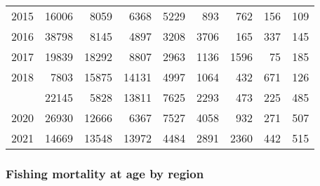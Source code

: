 \documentclass[
]{article}
\begin{document}
\begin{longtable}[t]{lrrrrrrrr}
2015 & 16006 & 8059 & 6368 & 5229 & 893 & 762 & 156 & 109\\
2016 & 38798 & 8145 & 4897 & 3208 & 3706 & 165 & 337 & 145\\
2017 & 19839 & 18292 & 8807 & 2963 & 1136 & 1596 & 75 & 185\\
2018 & 7803 & 15875 & 14131 & 4997 & 1064 & 432 & 671 & 126\\
\addlinespace
2019 & 22145 & 5828 & 13811 & 7625 & 2293 & 473 & 225 & 485\\
2020 & 26930 & 12666 & 6367 & 7527 & 4058 & 932 & 271 & 507\\
2021 & 14669 & 13548 & 13972 & 4484 & 2891 & 2360 & 442 & 515\\*
\end{longtable}

\hypertarget{fishing-mortality-at-age-by-region}{%
\subsubsection{Fishing mortality at age by
region}\label{fishing-mortality-at-age-by-region}}
\end{document}
